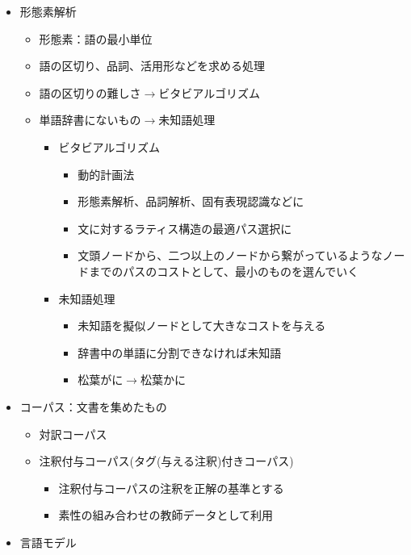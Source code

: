 \documentclass[a4j,11pt]{jsarticle}
\begin{document}
\begin{itemize}
 \item 形態素解析
       \begin{itemize}
	\item 形態素：語の最小単位
	\item 語の区切り、品詞、活用形などを求める処理
	\item 語の区切りの難しさ$\rightarrow$ビタビアルゴリズム
	\item 単語辞書にないもの$\rightarrow$未知語処理
	      \begin{itemize}

	       \item ビタビアルゴリズム
		     \begin{itemize}
		      \item 動的計画法
		      \item 形態素解析、品詞解析、固有表現認識などに
		      \item 文に対するラティス構造の最適パス選択に
		      \item 文頭ノードから、二つ以上のノードから繋がっているようなノー
	    ドまでのパスのコストとして、最小のものを選んでいく
		     \end{itemize}
	       \item 未知語処理
		     \begin{itemize}
		      \item 未知語を擬似ノードとして大きなコストを与える
		      \item 辞書中の単語に分割できなければ未知語
		      \item 松葉がに$\rightarrow$松葉かに
		     \end{itemize}
	      \end{itemize}
       \end{itemize}
 \item コーパス：文書を集めたもの
       \begin{itemize}
	\item 対訳コーパス
	\item 注釈付与コーパス(タグ(与える注釈)付きコーパス)
	      \begin{itemize}
	       \item 注釈付与コーパスの注釈を正解の基準とする
	       \item 素性の組み合わせの教師データとして利用
	      \end{itemize}
       \end{itemize}
 \item 言語モデル
       \begin{itemize}

\end{itemize}
\end{itemize}
\end{document}
